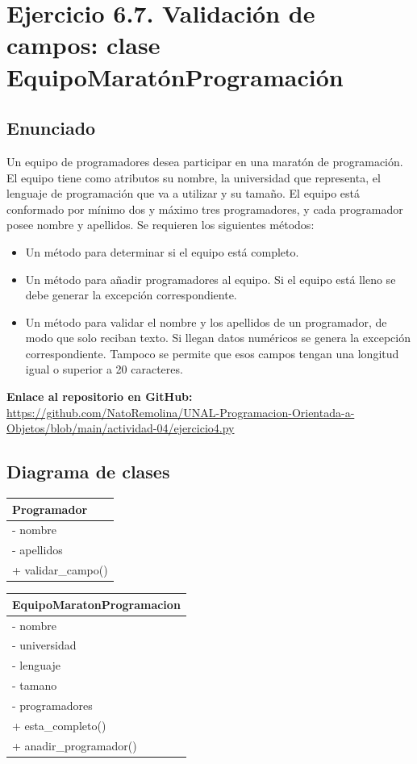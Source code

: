 \documentclass[11pt, a4paper]{article}
\newcommand{\clasebox}[3]{%
\begin{center}
\begin{tabular}{|l|}
\hline
\textbf{#1} \\
\hline
#2
\hline
#3
\hline
\end{tabular}
\end{center}
}
\begin{document}
\section{Ejercicio 6.7. Validación de campos: clase EquipoMaratónProgramación}

\subsection{Enunciado}
Un equipo de programadores desea participar en una maratón de programación. El equipo tiene
como atributos su nombre, la universidad que representa, el lenguaje de programación que va a
utilizar y su tamaño. El equipo está conformado por mínimo dos y máximo tres programadores, y
cada programador posee nombre y apellidos. Se requieren los siguientes métodos:

\begin{itemize}
    \item Un método para determinar si el equipo está completo.
    \item Un método para añadir programadores al equipo. Si el equipo está lleno se debe generar
          la excepción correspondiente.
    \item Un método para validar el nombre y los apellidos de un programador, de modo que solo
          reciban texto. Si llegan datos numéricos se genera la excepción correspondiente.
          Tampoco se permite que esos campos tengan una longitud igual o superior a 20 caracteres.
\end{itemize}

\noindent \textbf{Enlace al repositorio en GitHub:} \\
\url{https://github.com/NatoRemolina/UNAL-Programacion-Orientada-a-Objetos/blob/main/actividad-04/ejercicio4.py}

\subsection{Diagrama de clases}
\clasebox{Programador}
{%
- nombre \\
- apellidos \\
}
{%
+ validar\_campo() \\
}

\clasebox{EquipoMaratonProgramacion}
{%
- nombre \\
- universidad \\
- lenguaje \\
- tamano \\
- programadores \\
}
{%
+ esta\_completo() \\
+ anadir\_programador() \\
}
\end{document}
